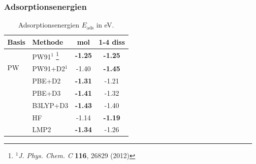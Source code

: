 \documentclass[hyperref={pdfpagelabels=false}]{beamer}
\newcommand\blfootnote[1]{%
  \begingroup
  \renewcommand\thefootnote{}\footnote{#1}%
  \addtocounter{footnote}{-1}%
  \endgroup
}
\begin{document}
\begin{frame}
 \frametitle{Adsorptionsenergien}
 \begin{table}[!h]
  \centering
   \caption{Adsorptionsenergien $E_\textrm{ads}$ in eV.} %
  \begin{tabular}{ll|cc}
  \toprule
Basis& Methode & mol &1-4 diss\\\midrule
  \multirow{3}{1cm}{PW}&PW91$^1$\blfootnote{$^1$\textit{J. Phys. Chem. C} \textbf{116}, 26829 (2012)} &\textbf{-1.25} &\textbf{-1.25} \\
  &PW91+D2$^1$&-1.40 &\textbf{-1.45} \\\hline
  &PBE+D2 & \textbf{-1.31} & -1.21 \\
  \midrule \pause
  \multirow{4}{1cm}{AO}&PBE+D3 &\textbf{-1.41} &-1.32 \\
  &B3LYP+D3 &\textbf{-1.43} &-1.40 \\
  &HF &-1.14 &\textbf{-1.19} \\
  &LMP2 &\textbf{-1.34} &-1.26\\
  \bottomrule
  \end{tabular}
 \end{table}
\end{frame}
\end{document}
